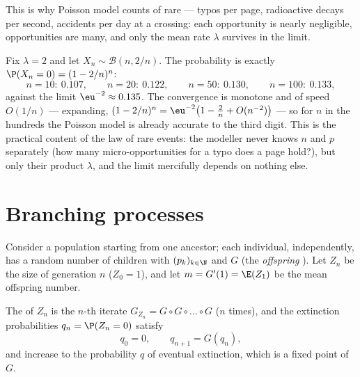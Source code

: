 \begin{remark}
This is why Poisson  model counts of rare  --- typos per
page, radioactive decays per second, accidents per day at a
crossing: each opportunity is nearly negligible, opportunities are
many, and only the mean rate $\lambda$ survives in the limit.
\end{remark}

\begin{example}\label{ex:b2:genfun:poissonnumerics}
Fix $\lambda = 2$ and let $X_n \sim \mathcal B(n, 2/n)$. The
 probability is exactly $\P(X_n = 0) = (1 - 2/n)^n$:
\[
n = 10:\ 0.107, \qquad
n = 20:\ 0.122, \qquad
n = 50:\ 0.130, \qquad
n = 100:\ 0.133,
\]
against the limit $\eu^{-2} \approx 0.135$. The convergence
is monotone and of speed $O(1/n)$ --- expanding, $(1 -
2/n)^n = \eu^{-2}\bigl(1 - \tfrac2n + O(n^{-2})\bigr)$ ---
so for $n$ in the hundreds the Poisson model is already
accurate to the third digit. This is the practical content
of the law of rare events: the modeller never knows $n$ and
$p$ separately (how many micro-opportunities for a typo does
a page hold?), but only their product $\lambda$, and the
limit  mercifully depends on nothing else.
\end{example}

\section{Branching processes}

Consider a population starting from one ancestor; each individual,
independently, has a random number of children with  $(p_k)_{k
\in \N}$ and  $G$ (the \emph{offspring
}). Let $Z_n$ be the size of generation $n$ ($Z_0 =
1$), and let $m = G'(1) = \E(Z_1)$ be the mean offspring number.

\begin{proposition}\label{prop:b2:genfun:branching}
The  of $Z_n$ is the $n$-th iterate
$G_{Z_n} = G \circ G \circ \dots \circ G$ ($n$ times), and the
extinction probabilities $q_n = \P(Z_n = 0)$ satisfy
\[
q_0 = 0, \qquad q_{n+1} = G(q_n),
\]
and increase to the probability $q$ of eventual extinction, which
is a fixed point of $G$.
\end{proposition}

